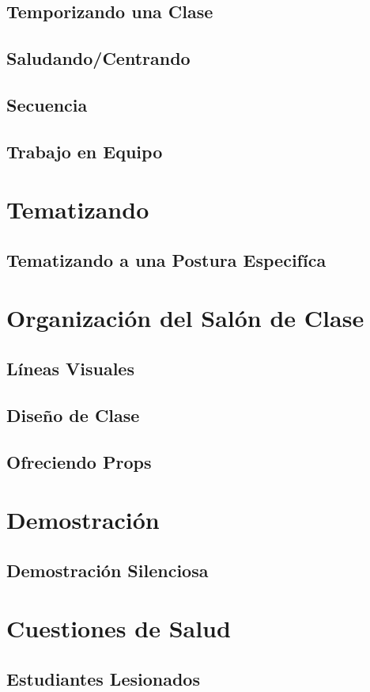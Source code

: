 \subsection{Temporizando una Clase}
\subsection{Saludando/Centrando}
\subsection{Secuencia}
\subsection{Trabajo en Equipo}
\section{Tematizando}
\subsection{Tematizando a una Postura Especifíca}
\section{Organización del Salón de Clase}
\subsection{Líneas Visuales}
\subsection{Diseño de Clase}
\subsection{Ofreciendo Props}
\section{Demostración}
\subsection{Demostración Silenciosa}
\section{Cuestiones de Salud}
\subsection{Estudiantes Lesionados}
